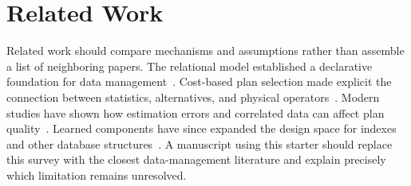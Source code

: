 \section{Related Work}

Related work should compare mechanisms and assumptions rather than assemble a
list of neighboring papers.  The relational model established a declarative
foundation for data management~\cite{codd1970}.  Cost-based plan selection made
explicit the connection between statistics, alternatives, and physical
operators~\cite{selinger1979}.  Modern studies have shown how estimation errors
and correlated data can affect plan quality~\cite{leis2015}.  Learned components
have since expanded the design space for indexes and other database
structures~\cite{kraska2018}.  A manuscript using this starter should replace
this survey with the closest data-management literature and explain precisely
which limitation remains unresolved.
